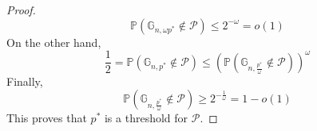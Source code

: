 \begin{proof}
	\begin{equation}
		\mathbb{P}(\mathbb{G}_{n, \omega p^*} \not\in \mathcal{P}) \leq 2^{-\omega} = o(1)
	\end{equation}
	On the other hand,
	\begin{equation}
		\frac{1}{2} = \mathbb{P}(\mathbb{G}_{n,p^*} \not\in \mathcal{P}) \leq (\mathbb{P}(\mathbb{G}_{n, \frac{p^*}{\omega}} \not\in \mathcal{P}))^{\omega}
	\end{equation}
	Finally, 
	\begin{equation}
		\mathbb{P}(\mathbb{G}_{n, \frac{p^*}{\omega}} \not \in \mathcal{P}) \geq 2^{-\frac{1}{\omega}} = 1 -o(1)
	\end{equation}
	This proves that $p^*$ is a threshold for $\mathcal{P}$.
\end{proof}

